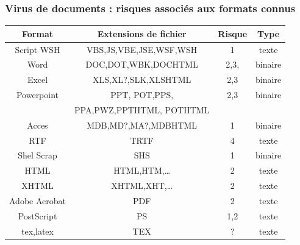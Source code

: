 \documentclass{beamer}
\begin{document}



\begin{frame}
\frametitle{Virus de documents : risques associés aux formats connus}
\begin{center}
\begin{small}
\begin{tabular}{|c|c|c|c|}
\hline
Format & Extensions de fichier & Risque & Type \\
\hline
\hline
Script WSH & VBS,JS,VBE,JSE,WSF,WSH & 1 & texte \\
\hline
Word & DOC,DOT,WBK,DOCHTML & 2,3, & binaire \\
\hline 
Excel & XLS,XL?,SLK,XLSHTML & 2,3 & binaire \\
\hline
Powerpoint & PPT, POT,PPS, & 2,3 & binaire \\
 & PPA,PWZ,PPTHTML, POTHTML & & \\
\hline
Acces & MDB,MD?,MA?,MDBHTML & 1 &binaire \\
\hline
RTF & TRTF & 4 & texte \\
\hline
Shel Scrap & SHS & 1 & binaire \\
\hline
HTML & HTML,HTM,\ldots & 2 & texte\\
\hline
XHTML & XHTML,XHT,\ldots & 2 & texte\\
\hline
Adobe Acrobat & PDF & 2 & texte \\
\hline
PostScript & PS & 1,2 & texte \\
\hline
tex,latex & TEX & ? & texte \\
\hline
\end{tabular}
\end{small}
\end{center}
\end{frame}
\end{document}
